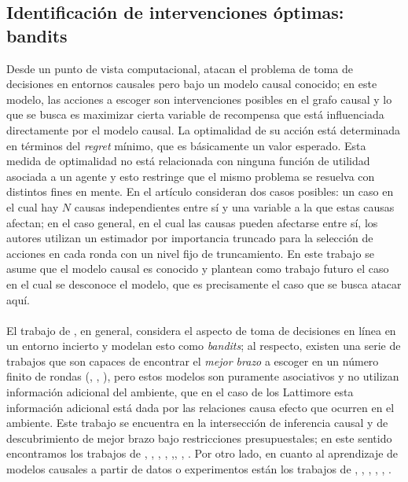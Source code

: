 \documentclass[11pt]{article}
\theoremstyle{plain}
\begin{document}
\subsection{Identificación de intervenciones óptimas: bandits}
Desde un punto de vista computacional, \cite{lattimoreNIPS2016} atacan el problema de toma de decisiones en entornos causales pero bajo un modelo causal conocido; en este modelo, las acciones a escoger son intervenciones posibles en el grafo causal y lo que se busca es maximizar cierta variable de recompensa que está influenciada directamente por el modelo causal. La optimalidad de su acción está determinada en términos del \textit{regret} mínimo, que es básicamente un valor esperado. Esta medida de optimalidad no está relacionada con ninguna función de utilidad asociada a un agente y esto restringe que el mismo problema se resuelva con distintos fines en mente. En el artículo consideran dos casos posibles: un caso en el cual hay $N$ causas independientes entre sí y una variable a la que estas causas afectan; en el caso general, en el cual las causas pueden afectarse entre sí, los autores utilizan un estimador por importancia truncado para la selección de acciones en cada ronda con un nivel fijo de truncamiento. En este trabajo se asume que el modelo causal es conocido y plantean como trabajo futuro el caso en el cual se desconoce el modelo, que es precisamente el caso que se busca atacar aquí.\\
\\
\indent El trabajo de \cite{lattimoreNIPS2016}, en general, considera el aspecto de toma de decisiones en línea en un entorno incierto y modelan esto como \textit{bandits}; al respecto, existen una serie de trabajos que son capaces de encontrar el \textit{mejor brazo} a escoger en un número finito de rondas (\cite{bubeck2009pure}, \cite{gabillon2012best}, \cite{agarwal2014taming}), pero estos modelos son puramente asociativos y no utilizan información adicional del ambiente, que en el caso de los Lattimore esta información adicional está dada por las relaciones causa efecto que ocurren en el ambiente. Este trabajo se encuentra en la intersección de inferencia causal y de descubrimiento de mejor brazo bajo restricciones presupuestales; en este sentido encontramos los trabajos de \cite{audibert2010best}, \cite{jamieson2014lil},  \cite{jamieson2014best},  \cite{ortega2014generalized}, \cite{chen2015optimal},\cite{carpentier2016tight},  \cite{russo2016simple},  \cite{kaufmann2016complexity}. Por otro lado, en cuanto al aprendizaje de modelos causales a partir de datos o experimentos están los trabajos de \cite{eberhardt2008almost}, \cite{mooij2016distinguishing}, \cite{hyttinen2013experiment}, \cite{hauser2012two}, \cite{loh2014high}, \cite{shanmugam2015learning}.\\
\end{document}
